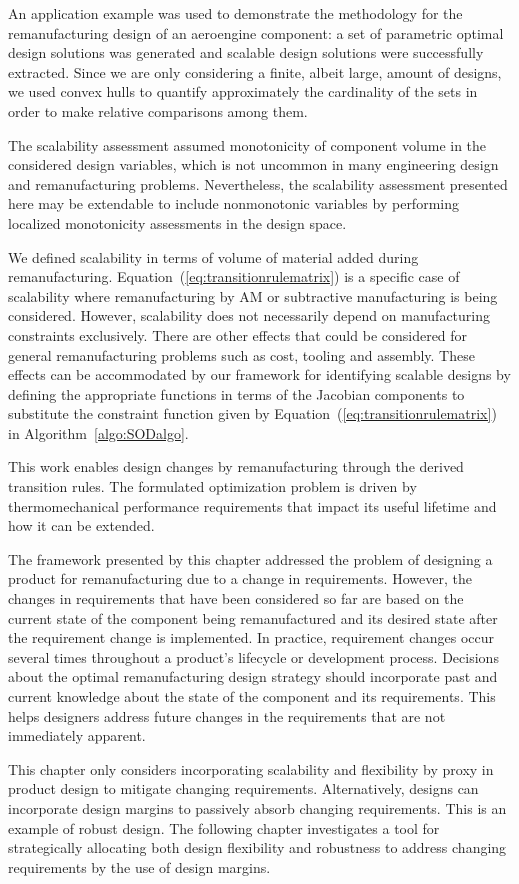 An application example was used to demonstrate the methodology for the remanufacturing design of an aeroengine component: a set of parametric optimal design solutions was generated and scalable design solutions were successfully extracted. Since we are only considering a finite, albeit large, amount of designs, we used convex hulls to quantify approximately the cardinality of the sets in order to make relative comparisons among them. 

The scalability assessment assumed monotonicity of component volume in the considered design variables, which is not uncommon in many engineering design and remanufacturing problems. Nevertheless, the scalability assessment presented here may be extendable to include nonmonotonic variables by performing localized monotonicity assessments in the design space. 

{\color{red} We defined scalability in terms of volume of material added during remanufacturing. Equation~(\ref{eq:transitionrulematrix}) is a specific case of scalability where remanufacturing by \ac{AM} or subtractive manufacturing is being considered. However, scalability does not necessarily depend on manufacturing constraints exclusively. There are other effects that could be considered for general remanufacturing problems such as cost, tooling and assembly. These effects can be accommodated by our framework for identifying scalable designs by defining the appropriate functions in terms of the Jacobian components to substitute the constraint function given by Equation~(\ref{eq:transitionrulematrix}) in Algorithm~\ref{algo:SODalgo}.}

This work enables design changes by remanufacturing through the derived transition rules. The formulated optimization problem is driven by thermomechanical performance requirements that impact its useful lifetime and how it can be extended.

The framework presented by this chapter addressed the problem of designing a product for remanufacturing due to a change in requirements. However, the changes in requirements that have been considered so far are based on the current state of the component being remanufactured and its desired state after the requirement change is implemented. In practice, requirement changes occur several times throughout a product's lifecycle or development process. Decisions about the optimal remanufacturing design strategy should incorporate past and current knowledge about the state of the component and its requirements. This helps designers address future changes in the requirements that are not immediately apparent.

{\color{red} This chapter only considers incorporating scalability and flexibility by proxy in product design to mitigate changing requirements. Alternatively, designs can incorporate design margins to passively absorb changing requirements. This is an example of robust design. The following chapter investigates a tool for strategically allocating both design flexibility and robustness to address changing requirements by the use of design margins.}

